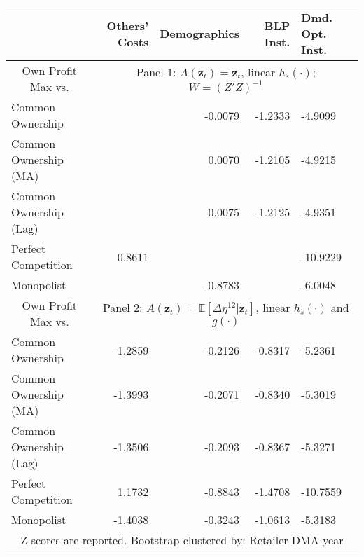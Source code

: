\begin{tabular}{l r r r b }
\toprule
                        &  Others' Costs &  Demographics &  BLP Inst. &  Dmd. Opt. Inst. \\
\midrule
\multicolumn{1}{c}{Own Profit Max vs.}& \multicolumn{4}{c}{Panel 1: $A(\symbf{z}_t) = \symbf{z}_t$, linear $h_s(\cdot)$; $W=(Z'Z)^{-1}$ }\\
\cmidrule(lr){1-1} \cmidrule(lr){2-5}
 Common Ownership &         \cellcolor[HTML]{C0C0C0}{-2.4732} &       -0.0079 &    -1.2333 &          -4.9099 \\
  Common Ownership (MA) &         \cellcolor[HTML]{C0C0C0}{-2.5918} &        0.0070 &    -1.2105 &          -4.9215 \\
 Common Ownership (Lag) &         \cellcolor[HTML]{C0C0C0}{-2.5208} &        0.0075 &    -1.2125 &          -4.9351 \\
                Perfect Competition &         0.8611 &        \cellcolor[HTML]{C0C0C0}{-2.3033}  &     \cellcolor[HTML]{C0C0C0}{-3.1652} &         -10.9229 \\
      Monopolist &         \cellcolor[HTML]{C0C0C0}{-2.4166} &       -0.8783 &     \cellcolor[HTML]{C0C0C0}{-3.5162} &          -6.0048 \\
 
\midrule
\multicolumn{1}{c}{Own Profit Max vs.}& \multicolumn{4}{c}{Panel 2:  $A(\symbf{z}_t) = \mathbb{E}[\Delta\eta^{12}|\symbf{z}_t]$, linear $h_s(\cdot)$ and $g(\cdot)$}\\
\cmidrule(lr){1-1} \cmidrule(lr){2-5}
       Common Ownership &        -1.2859 &       -0.2126 &    -0.8317 &          -5.2361 \\
  Common Ownership (MA) &        -1.3993 &       -0.2071 &    -0.8340 &          -5.3019 \\
 Common Ownership (Lag) &        -1.3506 &       -0.2093 &    -0.8367 &          -5.3271 \\
    Perfect Competition &         1.1732 &       -0.8843 &    -1.4708 &         -10.7559 \\
      Monopolist &        -1.4038 &       -0.3243 &    -1.0613 &          -5.3183 \\
\bottomrule
\multicolumn{5}{c}{Z-scores are reported. Bootstrap clustered by: Retailer-DMA-year}
\end{tabular}
